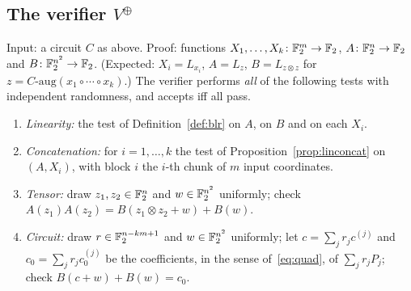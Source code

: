 \subsection{The verifier $V^{\oplus}$}

\begin{definition}\label{def:vplus}
Input: a circuit $C$ as above.  Proof: functions $X_1,\dots,X_k\colon\mathbb{F}_2^m\to\mathbb{F}_2$, $A\colon\mathbb{F}_2^n\to\mathbb{F}_2$ and $B\colon\mathbb{F}_2^{n^2}\to\mathbb{F}_2$.  (Expected: $X_i=L_{x_i}$, $A=L_z$, $B=L_{z\otimes z}$ for $z=C\text{-aug}(x_1\circ\cdots\circ x_k)$.)
The verifier performs \emph{all} of the following tests with independent randomness, and accepts iff all pass.
\begin{enumerate}
  \item \emph{Linearity:} the test of Definition~\ref{def:blr} on $A$, on $B$ and on each $X_i$.
  \item \emph{Concatenation:} for $i=1,\dots,k$ the test of Proposition~\ref{prop:linconcat} on $(A,X_i)$, with block $i$ the $i$-th chunk of $m$ input coordinates.
  \item \emph{Tensor:} draw $z_1,z_2\in\mathbb{F}_2^n$ and $w\in\mathbb{F}_2^{n^2}$ uniformly; check $A(z_1)A(z_2)=B(z_1\otimes z_2+w)+B(w)$.
  \item \emph{Circuit:} draw $r\in\mathbb{F}_2^{n-km+1}$ and $w\in\mathbb{F}_2^{n^2}$ uniformly; let $c=\sum_jr_jc^{(j)}$ and $c_0=\sum_jr_jc^{(j)}_0$ be the coefficients, in the sense of~\eqref{eq:quad}, of $\sum_jr_jP_j$; check $B(c+w)+B(w)=c_0$.
\end{enumerate}
\end{definition}

